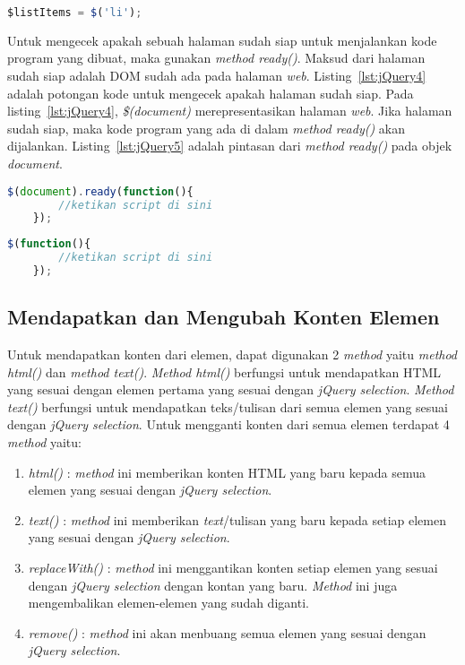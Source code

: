 \begin{lstlisting}[language=Javascript, caption=Menyimpan objek jQuery , label={lst:jQuery3}]
	$listItems = $('li');
\end{lstlisting}

Untuk mengecek apakah sebuah halaman sudah siap untuk menjalankan kode program yang dibuat, maka gunakan \textit{method ready()}. Maksud dari halaman sudah siap adalah DOM sudah ada pada halaman \textit{web}. Listing~\ref{lst:jQuery4} adalah potongan kode untuk mengecek apakah halaman sudah siap. Pada listing~\ref{lst:jQuery4}, \textit{\$(document)} merepresentasikan halaman \textit{web}. Jika halaman sudah siap, maka kode program yang ada di dalam \textit{method ready()} akan dijalankan. Listing~\ref{lst:jQuery5} adalah pintasan dari \textit{method ready()} pada objek \textit{document}.

\begin{lstlisting}[language=Javascript, caption=Mengecek apakah halaman sudah siap , label={lst:jQuery4}]
	$(document).ready(function(){
		//ketikan script di sini
	});
\end{lstlisting}

\begin{lstlisting}[language=Javascript, caption=Pintasan dari method \$(document).ready() , label={lst:jQuery5}]
	$(function(){
		//ketikan script di sini
	});
\end{lstlisting}

\subsection{Mendapatkan dan Mengubah Konten Elemen}
Untuk mendapatkan konten dari elemen, dapat digunakan 2 \textit{method} yaitu \textit{method html()} dan \textit{method text()}. \textit{Method html()} berfungsi untuk mendapatkan HTML yang sesuai dengan elemen pertama yang sesuai dengan \textit{jQuery selection}. \textit{Method text()} berfungsi untuk mendapatkan teks/tulisan dari semua elemen yang sesuai dengan \textit{jQuery selection}. Untuk mengganti konten dari semua elemen terdapat 4 \textit{method} yaitu:

\begin{enumerate}
	\item \textit{html()} : \textit{method} ini memberikan konten HTML yang baru kepada semua elemen yang sesuai dengan \textit{jQuery selection}.
	\item \textit{text()} : \textit{method} ini memberikan \textit{text}/tulisan yang baru kepada setiap elemen yang sesuai dengan \textit{jQuery selection}.
	\item \textit{replaceWith()} : \textit{method} ini menggantikan konten setiap elemen yang sesuai dengan \textit{jQuery selection} dengan kontan yang baru. \textit{Method} ini juga mengembalikan elemen-elemen yang sudah diganti.
	\item \textit{remove()} : \textit{method} ini akan menbuang semua elemen yang sesuai dengan \textit{jQuery selection}.
\end{enumerate}

